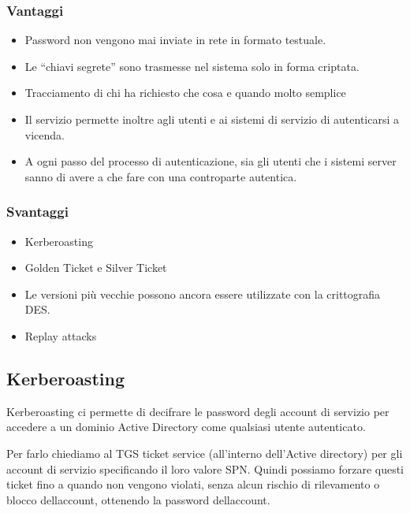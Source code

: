 \subsubsection{Vantaggi}\label{vantaggi-1}

\begin{itemize}
\item
  Password non vengono mai inviate in rete in formato testuale.
\item
  Le ``chiavi segrete'' sono trasmesse nel sistema solo in forma
  criptata.
\item
  Tracciamento di chi ha richiesto che cosa e quando molto semplice
\item
  Il servizio permette inoltre agli utenti e ai sistemi di servizio di
  autenticarsi a vicenda.
\item
  A ogni passo del processo di autenticazione, sia gli utenti che i
  sistemi server sanno di avere a che fare con una controparte
  autentica.
\end{itemize}

\subsubsection{Svantaggi}\label{svantaggi-1}

\begin{itemize}
\item
  Kerberoasting
\item
  Golden Ticket e Silver Ticket
\item
  Le versioni più vecchie possono ancora essere utilizzate con la
  crittografia DES.
\item
  Replay attacks
\end{itemize}

\subsection{Kerberoasting}\label{kerberoasting}

Kerberoasting ci permette di decifrare le password degli account di
servizio per accedere a un dominio Active Directory come qualsiasi
utente autenticato.

Per farlo chiediamo al TGS ticket service (all'interno dell'Active
directory) per gli account di servizio specificando il loro valore SPN.
Quindi possiamo forzare questi ticket fino a quando non vengono violati,
senza alcun rischio di rilevamento o blocco
dell\textquotesingle account, ottenendo la password
dell\textquotesingle account.

